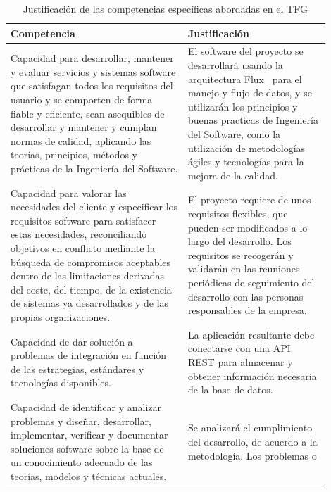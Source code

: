 \documentclass{pre-tfg}
\begin{document}


    \begin{table}[hp]
        \centering
        \caption{Justificación de las competencias específicas abordadas en el TFG}
        \label{tab:competencias}

        \begin{tabular}{p{0.5\linewidth}p{0.4\linewidth}}
            \textbf{Competencia} & \textbf{Justificación} \\
            \hline
            Capacidad para desarrollar, mantener y evaluar servicios y sistemas software que satisfagan
            todos los requisitos del usuario y se comporten de forma fiable y eficiente, sean asequibles
            de desarrollar y mantener y cumplan normas de calidad, aplicando las teorías, principios,
            métodos y prácticas de la Ingeniería del Software.
            & El software del proyecto se desarrollará usando la arquitectura Flux~\cite{FLUX} para el manejo
             y flujo de datos, y se utilizarán los principios  y buenas practicas de Ingeniería del Software, 
             como la utilización de metodologías ágiles y tecnologías para la mejora de la calidad.\\
            Capacidad para valorar las necesidades del cliente y especificar los requisitos software para
            satisfacer estas necesidades, reconciliando objetivos en conflicto mediante la búsqueda de
            compromisos aceptables dentro de las limitaciones derivadas del coste, del tiempo, de la existencia
            de sistemas ya desarrollados y de las propias organizaciones.
            & El proyecto requiere de unos requisitos flexibles, que pueden ser modificados a lo largo del
            desarrollo. Los requisitos se recogerán y validarán en las reuniones periódicas de seguimiento
            del desarrollo con las personas responsables de la empresa.\\
            Capacidad de dar solución a problemas de integración en función de las estrategias, estándares
            y tecnologías disponibles.
            & La aplicación resultante debe conectarse con una API REST para almacenar y obtener información
            necesaria de la base de datos.\\
            Capacidad de identificar y analizar problemas y diseñar, desarrollar, implementar, verificar y
            documentar soluciones software sobre la base de un conocimiento adecuado de las teorías, modelos
            y técnicas actuales.
            & Se analizará el cumplimiento del desarrollo, de acuerdo a la metodología. Los problemas o

\end{tabular}
\end{table}
\end{document}
